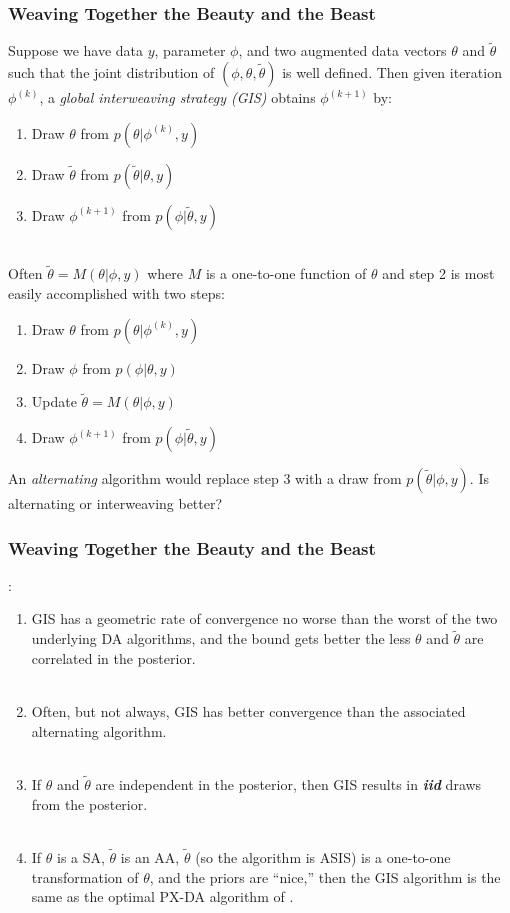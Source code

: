 \documentclass[xcolor=dvipsnames]{beamer}
\begin{document}
\begin{frame}
  \frametitle{Weaving Together the Beauty and the Beast}
  Suppose we have data $y$, parameter $\phi$, and two augmented data vectors $\theta$ and $\tilde{\theta}$ such that the joint distribution of $(\phi, \theta, \tilde{\theta})$ is well defined. Then given iteration $\phi^{(k)}$, a {\it \color{red} global interweaving strategy (GIS)} obtains $\phi^{(k+1)}$ by:
  \begin{enumerate}
  \item Draw $\theta$ from $p(\theta|\phi^{(k)},y)$
  \item Draw $\tilde{\theta}$ from $p(\tilde{\theta}|\theta,y)$
  \item Draw $\phi^{(k+1)}$ from $p(\phi|\tilde{\theta},y)$\\~\\
  \end{enumerate}
  \pause
  Often $\tilde{\theta}=M(\theta|\phi,y)$ where $M$ is a one-to-one function of $\theta$ and step 2 is most easily accomplished with two steps:
  \begin{enumerate}
  \item Draw $\theta$ from $p(\theta|\phi^{(k)},y)$
  \item Draw $\phi$ from $p(\phi|\theta,y)$
  \item Update $\tilde{\theta}=M(\theta|\phi,y)$
  \item Draw $\phi^{(k+1)}$ from $p(\phi|\tilde{\theta},y)$
  \end{enumerate}
An {\it \color{red} alternating} algorithm would replace step 3 with a draw from $p(\tilde{\theta}|\phi,y)$. Is alternating or interweaving better?
\end{frame}

\begin{frame}
  \frametitle{Weaving Together the Beauty and the Beast}
  \citet{yu2011center}: 
  \begin{enumerate}
  \item  GIS has a geometric rate of convergence no worse than the worst of the two underlying DA algorithms, and the bound gets better the less $\theta$ and $\tilde{\theta}$ are correlated in the posterior.\\~\\
  \item Often, but not always, GIS has better convergence than the associated alternating algorithm.\\~\\
  \item If $\theta$ and $\tilde{\theta}$ are independent in the posterior, then GIS results in \textit{\textbf{iid}} draws from the posterior. \\~\\
  \item If $\theta$ is a SA, $\tilde{\theta}$ is an AA, $\tilde{\theta}$ (so the algorithm is ASIS) is a one-to-one transformation of $\theta$, and the priors are ``nice,'' then the GIS algorithm is the same as the optimal PX-DA algorithm of \citet{liu1999parameter}.
  \end{enumerate}
\end{frame}
\end{document}
